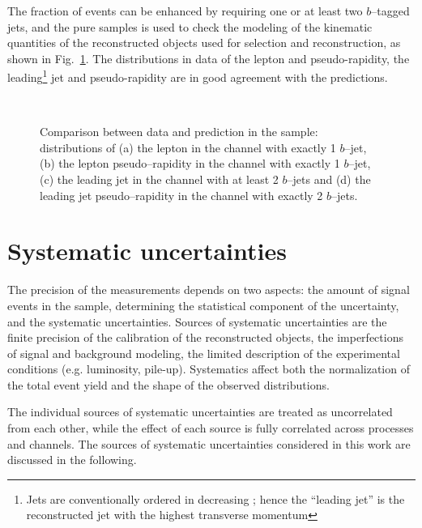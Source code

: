 The fraction of \ttbar{} events can be enhanced by requiring one or
at least two $b$--tagged jets, and the pure samples is used to check the
modeling of the kinematic quantities of the reconstructed
objects used for selection and reconstruction, as shown in
Fig.~\ref{fig:taggeddatamc}. 
The distributions in data of the lepton \pt{} and pseudo-rapidity, the
leading\footnote{Jets are conventionally ordered in decreasing \pt{};
  hence the ``leading jet'' is the reconstructed jet with the highest
  transverse momentum} jet \pt{} and pseudo-rapidity are in good
agreement with the predictions. 

\begin{figure}\centering
  \quad
  \\
  \quad
  \caption{
    Comparison between data and prediction in the \eighttev{} sample:
    distributions of (a) the lepton \pt{} in the \mujets{} channel with
    exactly 1 $b$--jet, (b) the lepton pseudo--rapidity in the \ejets{}
    channel with exactly 1 $b$--jet, (c) the leading jet \pt{} in the
    \mujets{} channel with at least 2 $b$--jets and (d) the leading
    jet pseudo--rapidity in the \ejets{} channel with exactly 2
    $b$--jets.
}
  \label{fig:taggeddatamc}
\end{figure}

\section{Systematic uncertainties}

The precision of the measurements depends on two aspects: the
amount of signal events in the sample, determining the statistical
component of the uncertainty, and the systematic uncertainties. 
Sources of systematic uncertainties are the finite precision of the
calibration of the reconstructed objects, the imperfections of signal
and background modeling, the limited description of the experimental
conditions (e.g. luminosity, pile-up).
Systematics affect both the normalization of the total event yield and the
shape of the observed distributions.

The individual sources of systematic uncertainties are treated as
uncorrelated from each other, while the effect of each source is fully
correlated across processes and channels.
The sources of systematic uncertainties considered in this work are
discussed in the following.

